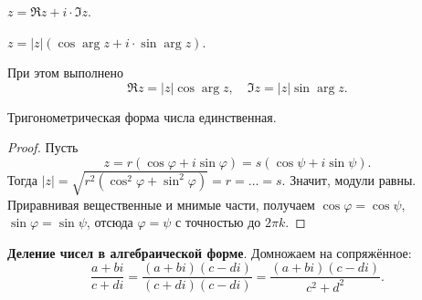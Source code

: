 \begin{definition}
    $z = \Re z + i \cdot \Im z$.
\end{definition}

\begin{definition}
    $z = |z|(\cos\arg z + i \cdot \sin\arg z)$.
\end{definition}

При этом выполнено
$$
\Re z = |z|\cos\arg z,\quad \Im z = |z|\sin\arg z.
$$

\begin{lemma}
    Тригонометрическая форма числа единственная.
\end{lemma}

\begin{proof}
    Пусть
    $$
    z = r(\cos\varphi + i\sin\varphi) = s(\cos\psi + i\sin\psi).
    $$
    Тогда $|z| = \sqrt{r^2(\cos^2\varphi + \sin^2\varphi)} = r = \ldots = s$. Значит, модули равны. Приравнивая вещественные и мнимые части, получаем $\cos\varphi = \cos\psi$, $\sin\varphi = \sin\psi$, отсюда $\varphi = \psi$ с точностью до $2\pi k$.
\end{proof}

\textbf{Деление чисел в алгебраической форме}. Домножаем на сопряжённое:
$$
\frac{a + bi}{c + di} = \frac{(a + bi)(c - di)}{(c + di)(c - di)} = \frac{(a + bi)(c - di)}{c^2 + d^2}.
$$


